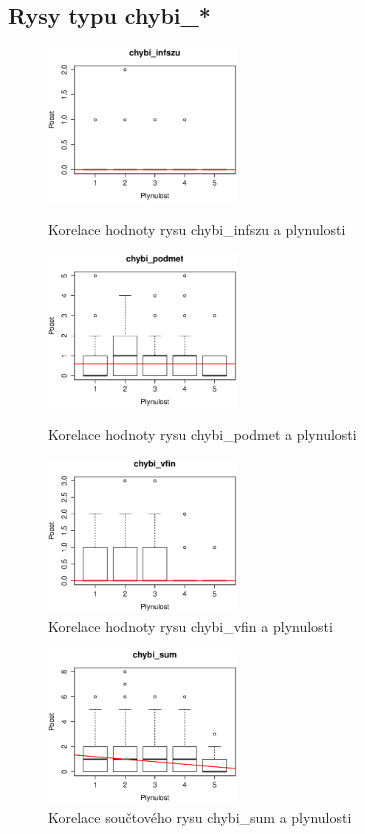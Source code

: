 \documentclass[12pt,a4paper]{report}
\begin{document}
\subsection{Rysy typu chybi\_*}
\begin{figure}[!htb]
  \centering\includegraphics[width=50mm]{./grafy/rysy/chybi_infszu.eps}
  \caption{Korelace hodnoty rysu chybi\_infszu a plynulosti}\label{gr:infszu}
\endminipage\hfill
{}
  \centering\includegraphics[width=50mm]{./grafy/rysy/chybi_podmet.eps}
  \caption{Korelace hodnoty rysu chybi\_podmet a plynulosti}\label{gr:podmet}
\endminipage\hfill
{}
  \centering\includegraphics[width=50mm]{./grafy/rysy/chybi_vfin.eps}
  \caption{Korelace hodnoty rysu chybi\_vfin a plynulosti}\label{gr:vfin}
\endminipage\hfill
\end{figure}

\begin{figure}[!htb]
\centering{}
  \centering\includegraphics[width=50mm]{./grafy/rysy/chybi_sum.eps}
  \caption{Korelace součtového rysu chybi\_sum a plynulosti}\label{gr:chybi}
\endminipage
\end{figure}
\end{document}
